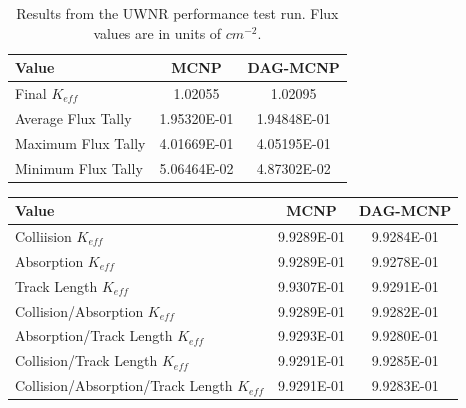 \documentclass[12pt, a4paper]{article}
\begin{document}
\begin{table}[H]
  \centering
  \caption{Results from the UWNR performance test run. Flux values are in units of $cm^{-2}$.}
  \label{uwnr_perf_results}
  \begin{tabular}{l c c}
    \toprule
    Value & MCNP & DAG-MCNP \\
    \hline
    Final $K_{eff}$ & 1.02055 & 1.02095 \\
    \hline
    Average Flux Tally & 1.95320E-01 & 1.94848E-01 \\
    \hline
    Maximum Flux Tally & 4.01669E-01 & 4.05195E-01 \\
    \hline
    Minimum Flux Tally & 5.06464E-02 & 4.87302E-02 \\
    \bottomrule
  \end{tabular}
\end{table}

\begin{table}[H]
  \centering
  \begin{tabular}{l c c}
    \toprule
    Value & MCNP & DAG-MCNP \\
    \hline
    Colliision $K_{eff}$ & 9.9289E-01 &  9.9284E-01 \\
    \hline
    Absorption $K_{eff}$ & 9.9289E-01 & 9.9278E-01 \\
    \hline
    Track Length $K_{eff}$ & 9.9307E-01 & 9.9291E-01 \\
    \hline
    Collision/Absorption $K_{eff}$ & 9.9289E-01 & 9.9282E-01 \\
    \hline
    Absorption/Track Length $K_{eff}$ & 9.9293E-01 & 9.9280E-01 \\
    \hline
    Collision/Track Length $K_{eff}$ & 9.9291E-01 & 9.9285E-01 \\
    \hline 
    Collision/Absorption/Track Length $K_{eff}$ & 9.9291E-01 & 9.9283E-01 \\
    \bottomrule    
  \end{tabular}
\end{table}
\end{document}
